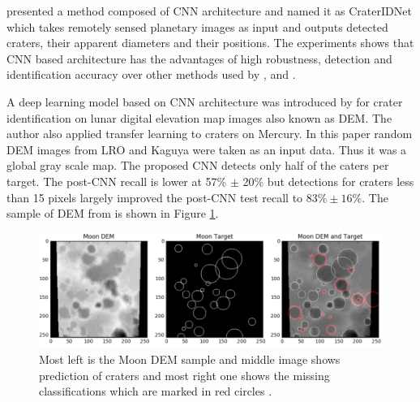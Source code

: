 \documentclass[11pt]{article}
\begin{document}
\cite{wang2018crateridnet} presented a method composed of CNN architecture and named it as CraterIDNet which takes remotely sensed planetary images as input and outputs detected craters, their apparent diameters and their positions. The experiments shows that CNN based architecture has the advantages of high robustness, detection and identification accuracy over other methods used by \cite{urbach2009automatic}, \cite{bandeira2010automatic} and \cite{ding2011subkilometer}.

A deep learning model based on CNN architecture was introduced by \cite{silburt2019lunar} for crater identification on lunar digital elevation map images also known as DEM. The author also applied transfer learning to craters on Mercury. In this paper random DEM images from LRO and Kaguya were taken as an input data. Thus it was a global gray scale map. The proposed CNN detects only half of the caters per target. The post-CNN recall is lower at 57\% $\pm$ 20\% but detections for craters less than 15 pixels largely improved the post-CNN test recall to $83 \% \pm 16 \%$. The sample of DEM from \cite{silburt2019lunar} is shown in Figure \ref{dem}.



\begin{figure}[ht!]
	\centering
	\includegraphics[width=.8\linewidth]{files/unet/dem.png}
	\caption{Most left is the Moon DEM sample and middle image shows prediction of craters and most right one shows the missing classifications which are marked in red circles \cite{silburt2019lunar}.}
	\label{dem}
\end{figure}




\end{document}
